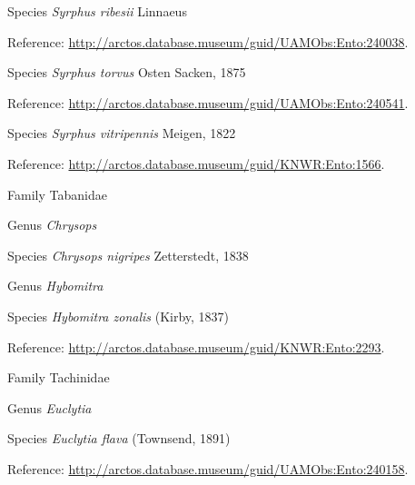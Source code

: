 \documentclass[9pt, article]{memoir}
\begin{document}
\begin{multicols}{2}
\vspace{6pt}\noindent\hspace{36pt}Species \textit{Syrphus ribesii} Linnaeus


Reference: 
\url{http://arctos.database.museum/guid/UAMObs:Ento:240038}.

\vspace{6pt}\noindent\hspace{36pt}Species \textit{Syrphus torvus} Osten Sacken, 1875


Reference: 
\url{http://arctos.database.museum/guid/UAMObs:Ento:240541}.

\vspace{6pt}\noindent\hspace{36pt}Species \textit{Syrphus vitripennis} Meigen, 1822


Reference: 
\url{http://arctos.database.museum/guid/KNWR:Ento:1566}.

\vspace{6pt}\noindent\hspace{24pt}Family Tabanidae


\vspace{6pt}\noindent\hspace{30pt}Genus \textit{Chrysops}


\vspace{6pt}\noindent\hspace{36pt}Species \textit{Chrysops nigripes} Zetterstedt, 1838


\vspace{6pt}\noindent\hspace{30pt}Genus \textit{Hybomitra}


\vspace{6pt}\noindent\hspace{36pt}Species \textit{Hybomitra zonalis} (Kirby, 1837)


Reference: 
\url{http://arctos.database.museum/guid/KNWR:Ento:2293}.

\vspace{6pt}\noindent\hspace{24pt}Family Tachinidae


\vspace{6pt}\noindent\hspace{30pt}Genus \textit{Euclytia}


\vspace{6pt}\noindent\hspace{36pt}Species \textit{Euclytia flava} (Townsend, 1891)


Reference: 
\url{http://arctos.database.museum/guid/UAMObs:Ento:240158}.


\end{multicols}
\end{document}
